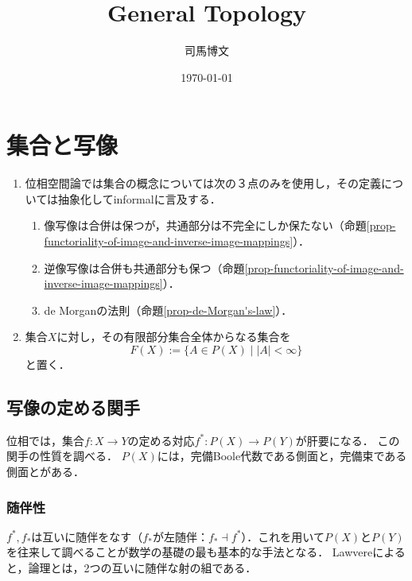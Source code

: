 \documentclass[uplatex,dvipdfmx]{jsreport}
\title{General Topology}
\author{司馬博文}
\date{\today}
\begin{document}
\tableofcontents

\chapter{集合と写像}

\begin{notation}\mbox{}
    \begin{enumerate}
        \item 位相空間論では集合の概念については次の３点のみを使用し，その定義については抽象化してinformalに言及する．
        \begin{enumerate}[(1)]
            \item 像写像は合併は保つが，共通部分は不完全にしか保たない（命題\ref{prop-functoriality-of-image-and-inverse-image-mappings}）．
            \item 逆像写像は合併も共通部分も保つ（命題\ref{prop-functoriality-of-image-and-inverse-image-mappings}）．
            \item de Morganの法則（命題\ref{prop-de-Morgan's-law}）．
        \end{enumerate}
        \item 集合$X$に対し，その有限部分集合全体からなる集合を
        \[ F(X):=\{A\in P(X)\mid|A|<\infty\} \]
        と置く．
    \end{enumerate}
\end{notation}

\section{写像の定める関手}

\begin{tcolorbox}[colframe=ForestGreen, colback=ForestGreen!10!white,breakable,colbacktitle=ForestGreen!40!white,coltitle=black,fonttitle=\bfseries\sffamily,
title=]
    位相では，集合$f:X\to Y$の定める対応$f^*:P(X)\to P(Y)$が肝要になる．
    この関手の性質を調べる．
    $P(X)$には，完備Boole代数である側面と，完備束である側面とがある．
\end{tcolorbox}

\subsection{随伴性}

\begin{tcolorbox}[colframe=ForestGreen, colback=ForestGreen!10!white,breakable,colbacktitle=ForestGreen!40!white,coltitle=black,fonttitle=\bfseries\sffamily,
title=]
    $f^*,f_*$は互いに随伴をなす（$f_*$が左随伴：$f_*\dashv f^*$）．これを用いて$P(X)$と$P(Y)$を往来して調べることが数学の基礎の最も基本的な手法となる．
    Lawvereによると，論理とは，2つの互いに随伴な射の組である．
\end{tcolorbox}
\end{document}
